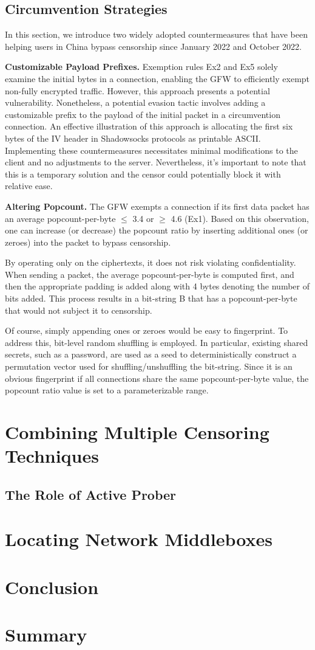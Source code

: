 \subsection{Circumvention Strategies}
In this section, we introduce two widely adopted countermeasures that have been helping users in China bypass censorship since January 2022 and October 2022.

\textbf{Customizable Payload Prefixes.} Exemption rules Ex2 and Ex5 solely examine the initial bytes in a connection, enabling the GFW to efficiently exempt non-fully encrypted traffic. However, this approach presents a potential vulnerability. Nonetheless, a potential evasion tactic involves adding a customizable prefix to the payload of the initial packet in a circumvention connection. An effective illustration of this approach is allocating the first six bytes of the IV header in Shadowsocks protocols as printable ASCII. Implementing these countermeasures necessitates minimal modifications to the client and no adjustments to the server. Nevertheless, it's important to note that this is a temporary solution and the censor could potentially block it with relative ease.

\textbf{Altering Popcount.} The GFW exempts a connection if its first data packet has an average popcount-per-byte ${\leq}$ 3.4 or ${\geq}$ 4.6 (Ex1). Based on this observation, one can increase (or decrease) the popcount ratio by inserting additional ones (or zeroes) into the packet to bypass censorship.

By operating only on the ciphertexts, it does not risk violating confidentiality. When sending a packet, the average popcount-per-byte is computed first, and then the appropriate padding is added along with 4 bytes denoting the number of bits added. This process results in a bit-string B that has a popcount-per-byte that would not subject it to censorship.

Of course, simply appending ones or zeroes would be easy to fingerprint. To address this, bit-level random shuffling is employed. In particular, existing shared secrets, such as a password, are used as a seed to deterministically construct a permutation vector used for shuffling/unshuffling the bit-string. Since it is an obvious fingerprint if all connections share the same popcount-per-byte value, the popcount ratio value is set to a parameterizable range.

\section{Combining Multiple Censoring Techniques}

\subsection{The Role of Active Prober}

\section{Locating Network Middleboxes}

\section{Conclusion}

\section{Summary}